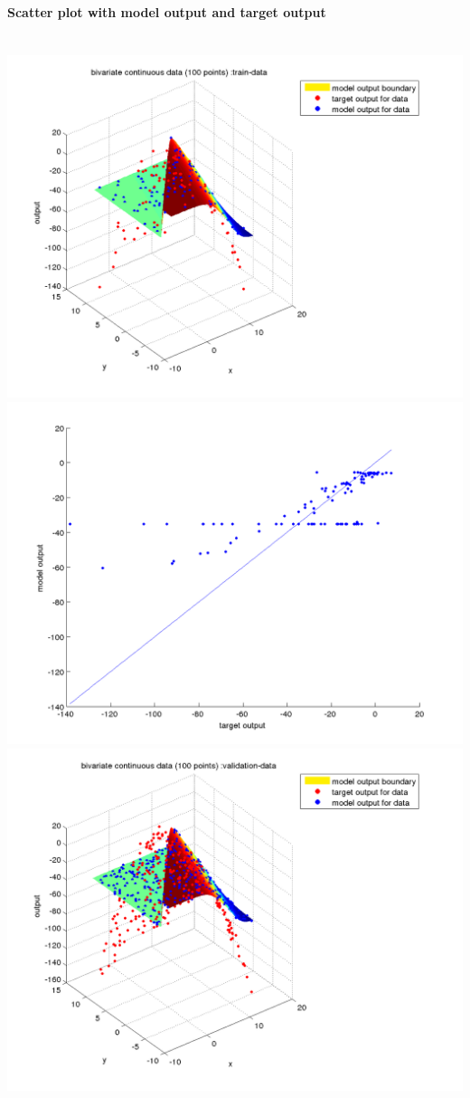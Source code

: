 \documentclass[fleqn]{article}
\newcommand{\myparagraph}[1]{\paragraph{#1}\mbox{}\\}
\begin{document}
\myparagraph{Scatter plot with model output and target output}
\includegraphics[scale=0.4]{./pics/bivariate100/_2_4/_2_4_epoch_10_train-data_scatter3d}
\includegraphics[scale=0.4]{./pics/bivariate100/_2_4/_2_4_epoch_10_train-data_scatter2d}
\includegraphics[scale=0.4]{./pics/bivariate100/_2_4/_2_4_epoch_10_validation-data_scatter3d}
\end{document}
